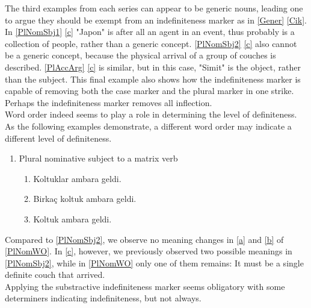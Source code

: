 \documentclass[11pt]{article} %
\begin{document}
The third examples from each series can appear to be generic nouns, leading one to argue they should be exempt from an indefiniteness marker as in \ref{Gener} \ref{Cik}. In \ref{PlNomSbj1} \ref{c} "Japon" is after all an agent in an event, thus probably is a collection of people, rather than a generic concept. \ref{PlNomSbj2} \ref{c} also cannot be a generic concept, because the physical arrival of a group of couches  is described. \ref{PlAccArg} \ref{c} is similar, but in this case, "Simit" is the object, rather than the subject. This final example also shows how the indefiniteness marker is capable of removing both the case marker and the plural marker in one strike. Perhaps the indefiniteness marker removes all inflection. \\ 

Word order indeed seems to play a role in determining the level of definiteness. As the following examples demonstrate, a different word order may indicate a different level of definiteness.

\begin{enumerate}[resume*] 
	\item Plural nominative subject to a matrix verb \label{PlNomWO}
	\begin{enumerate}[label=(\alph*), ref=(\alph*)]\itemsep1pt
	\item Koltuklar ambara geldi. \label{a}
	\item Birkaç koltuk ambara geldi. \label{b}
	\item Koltuk ambara geldi. \label{c}
	\end{enumerate}
\end{enumerate}

Compared to \ref{PlNomSbj2}, we observe no meaning changes in \ref{a} and \ref{b} of \ref{PlNomWO}. In \ref{c}, however, we previously observed two possible meanings in \ref{PlNomSbj2}, while in \ref{PlNomWO} only one of them remains: It must be a single definite couch that arrived. \\

Applying the substractive indefiniteness marker seems obligatory with some determiners indicating indefiniteness, but not always. 
\end{document}
